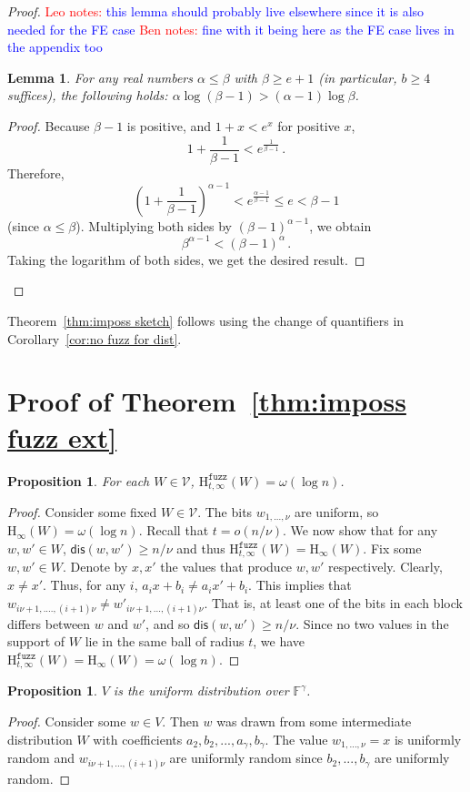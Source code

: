 \documentclass[11pt]{article}
\newcommand{\thref}[1]{\mbox{Theorem~\ref{#1}}}
\newcommand{\corref}[1]{\mbox{Corollary~\ref{#1}}}
\newcommand{\dis}{\ensuremath{\mathsf{dis}}}
\newcommand{\Hoo}{\mathrm{H}_\infty}
\newcommand{\Hfuzz}{\mathrm{H}^{\mathtt{fuzz}}_{t,\infty}}
\newtheorem{lemma}[theorem]{Lemma}
\newtheorem{proposition}[theorem]{Proposition}
\newcommand{\authnote}[2]{{\textcolor{red}{\textsf{#1 notes: }\textcolor{blue}{ #2}}\marginpar{\textcolor{red}{\textbf{!!!!!}}}}}
\newcommand{\authnote}[2]{}
\newcommand{\bnote}[1]{{\authnote{Ben}{#1}}}
\newcommand{\lnote}[1]{{\authnote{Leo}{#1}}}
\begin{document}
\begin{proof}
\lnote{this lemma should probably live elsewhere since it is also needed for the FE case}
\bnote{fine with it being here as the FE case lives in the appendix too}
\begin{lemma}
\label{lem:log-minus-one}
For any real numbers $\alpha \leq \beta$ with $\beta \ge e+1$ (in particular, $b\ge 4$ suffices), the following holds:
$\alpha \log (\beta-1) > (\alpha-1)\log \beta$. 
\end{lemma}

\begin{proof}
Because $\beta-1$ is positive, and $1+x<e^x$ for positive $x$,
$$1+\frac{1}{\beta-1} < e^{\frac{1}{\beta -1}}\,.$$  Therefore, 
$$\left(1+\frac{1}{\beta-1}\right)^{\alpha-1} < e^{\frac{\alpha-1}{\beta-1}}\le e < \beta-1$$ (since $\alpha\le \beta$). Multiplying both sides by $(\beta-1)^{\alpha-1}$, we obtain
$$\beta^{\alpha-1} < (\beta-1)^\alpha\,.$$
Taking the logarithm of both sides, we get the desired result.
\end{proof}

 \end{proof}
\noindent \thref{thm:imposs sketch} follows using the change of quantifiers in \corref{cor:no fuzz for dist}.


\section{Proof of \thref{thm:imposs fuzz ext}}
\label{sec:fuzz ext proof}
\begin{proposition} 
\label{prop:dist fuzzy ent fuzz}
For each $W\in\mathcal{V}$, $\Hfuzz(W) = \omega(\log n)$.
\end{proposition}
\begin{proof}
Consider some fixed $W\in\mathcal{V}$.  The bits $w_{1,..., \nu}$ are uniform, so $\Hoo(W) =\omega(\log n)$.  Recall that $t=o (n/\nu)$.  We now show that for any $w, w'\in W$, $\dis(w, w') \ge n/\nu$ and thus $\Hfuzz(W) = \Hoo(W)$.  Fix some $w, w'\in W$.  Denote by $x, x'$ the values that produce $w, w'$ respectively.  Clearly, $x\neq x'$.  Thus, for any $i$, $a_i x + b_i \neq a_i x' + b_i$.  This implies that $w_{i\nu+1,...., (i+1)\nu} \neq w'_{i\nu+1,..., (i+1)\nu}$. That is, at least one of the bits in each block differs between $w$ and $w'$, and so $\dis(w, w') \ge n/\nu$. Since no two values in the support of $W$ lie in the same ball of radius $t$, we have $\Hfuzz(W) = \Hoo(W)= \omega(\log n)$.
\end{proof}

\begin{proposition}\label{prop:dist uniform fuzz}
$V$ is the uniform distribution over $\mathbb{F}^\gamma$.
\end{proposition}
\begin{proof}
Consider some $w\in V$.  Then $w$ was drawn from some intermediate distribution $W$ with coefficients $a_2, b_2, ..., a_\gamma , b_\gamma$.  The value $w_{1,...,\nu} =x $ is uniformly random and $w_{i\nu+1,...,(i+1)\nu}$ are uniformly random since $b_2,..., b_\gamma$ are uniformly random.
\end{proof}
\end{document}
